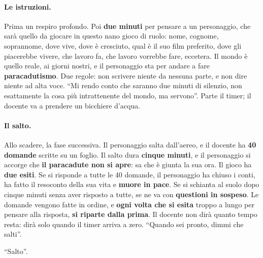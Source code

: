 \paragraph{Le istruzioni.} Prima un respiro profondo. Poi \textbf{due minuti} per
pensare a un personaggio, che sarà quello da giocare in questo nano gioco di ruolo:
nome, cognome, soprannome, dove vive, dove è cresciuto, qual è il suo film
preferito, dove gli piacerebbe vivere, che lavoro fa, che lavoro vorrebbe fare,
eccetera. Il mondo è quello reale, ai giorni nostri, e il personaggio sta per andare
a fare \textbf{paracadutismo}. Due regole: non scrivere niente da nessuna parte, e non
dire niente ad alta voce. ``Mi rendo conto che saranno due minuti di silenzio, non
esattamente la cosa più intrattenente del mondo, ma servono''. Parte il timer; il
docente va a prendere un bicchiere d'acqua.

\paragraph{Il salto.} Allo scadere, la fase successiva. Il personaggio salta
dall'aereo, e il docente ha \textbf{40 domande} scritte su un foglio. Il salto dura
\textbf{cinque minuti}, e il personaggio si accorge che \textbf{il paracadute non si
apre}: sa che è giunta la sua ora. Il gioco ha \textbf{due esiti}. Se si risponde a
tutte le 40 domande, il personaggio ha chiuso i conti, ha fatto il resoconto della
sua vita e \textbf{muore in pace}. Se si schianta al suolo dopo cinque minuti senza
aver risposto a tutte, se ne va con \textbf{questioni in sospeso}. Le domande vengono
fatte in ordine, e \textbf{ogni volta che si esita} troppo a lungo per pensare alla
risposta, \textbf{si riparte dalla prima}. Il docente non dirà quanto tempo resta:
dirà solo quando il timer arriva a zero. ``Quando sei pronto, dimmi che salti''.

``Salto''.


